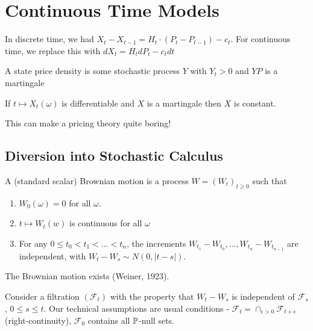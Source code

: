 \chapter{Continuous Time Models}
\label{cha:cont-time-models}

In discrete time, we had $X_{t} - X_{t-1} = H_{t} \cdot (P_{t} -
P_{t-1}) - c_{t}$.  For continuous time, we replace this with $dX_{t}
= H_{t} dP_{t} - c_{t} dt$

A state price density is some stochastic process
$Y$ with $Y_{t} > 0$ and $YP$ is a martingale

\begin{lem}
  If $t \mapsto X_{t}(\omega)$ is differentiable and $X$ is a
  martingale then $X$ is constant.
\end{lem}

This can make a pricing theory quite boring!

\newcommand{\ito}{It\^o\xspace}
\section{Diversion into Stochastic Calculus}
\label{sec:divers-into-stoch}

\begin{defn}
  \label{defn:continuous_time:1}
  A (standard scalar) Brownian motion is a process $W = (W_{t})_{t
    \geq 0}$ such that
  \begin{enumerate}
  \item $W_{0}(\omega) = 0$ for all $\omega$.
  \item $t \mapsto W_{t}(w)$ is continuous for all $\omega$
  \item For any $0 \leq t_{0} < t_{1} < \dots < t_{n}$, the increments
    $W_{t_{1}} - W_{t_{0}}, \dots, W_{t_{n}} - W_{t_{n-1}}$ are
    independent, with $W_{t} - W_{s} \sim N(0, |t-s|)$.
  \end{enumerate}
\end{defn}

\begin{thm}
  \label{defn:continuous_time:1}
  The Brownian motion exists (Weiner, 1923).
\end{thm}

Consider a filtration $(\mathcal{F}_{t})$ with the property that
$W_{t} - W_{s}$ is independent of $\mathcal{F}_{s}$, $0 \leq s \leq
t$. Our technical assumptions are usual conditions - $\mathcal{F}_{t}
= \cap_{\epsilon > 0} \mathcal{F}_{t + \epsilon}$ (right-continuity),
$\mathcal{F}_{0}$ contains all $\Prob$-null sets.


